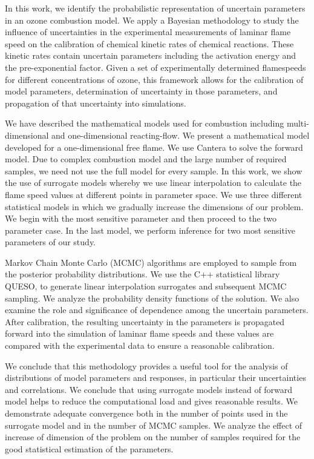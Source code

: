 

In this work, we identify the probabilistic representation of uncertain parameters in an ozone combustion model. We  apply a Bayesian methodology to study the influence of
uncertainties in the experimental measurements of laminar flame speed on the calibration of chemical kinetic rates of chemical reactions. These kinetic rates contain uncertain parameters including the activation energy and the pre-exponential factor. Given a set of experimentally determined flamespeeds for different concentrations of ozone, this framework allows for the
calibration of model parameters, determination of uncertainty in those parameters, and propagation
of that uncertainty into simulations.

\bigskip

We have described the mathematical models used for combustion including multi-dimensional and one-dimensional reacting-flow. We present a mathematical model developed for a one-dimensional free flame. We use Cantera to solve the forward model. Due to complex combustion model and the large number of required samples, we need not use the full model for every sample. In this work, we show the use of surrogate models whereby we use linear interpolation to calculate the flame speed values at different points in parameter space. We use three different statistical models in which we gradually increase the dimensions of our problem. We begin with the most sensitive parameter and then proceed to the two parameter case. In the last model, we perform inference for two most sensitive parameters of our study.  


\bigskip


Markov Chain Monte Carlo (MCMC) 
algorithms are employed to sample from the posterior probability distributions. We use the C++ statistical library QUESO, to generate 
linear  interpolation surrogates and subsequent MCMC sampling. We analyze the probability density functions of the solution. We
also examine the role and significance of dependence among the uncertain parameters. After calibration, the resulting uncertainty in the parameters is propagated forward into
the simulation of laminar flame speeds and these values are compared with the experimental data to ensure a reasonable calibration.


\bigskip



We conclude that this methodology provides a useful tool for the analysis of distributions of model parameters and
responses, in particular their uncertainties and correlations. We conclude that using surrogate models instead of forward model helps to reduce the computational load and gives reasonable results. We demonstrate adequate convergence both in the number of points used in the surrogate model and in the number of MCMC samples. We analyze the effect of increase of dimension of the problem on the number of samples required for the good statistical estimation of the parameters. 
